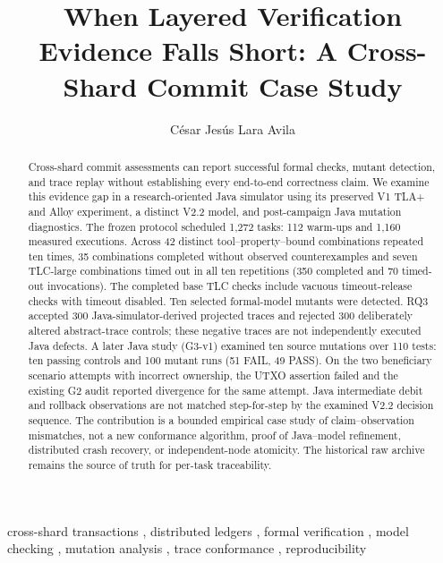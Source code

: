 \documentclass[preprint,12pt]{elsarticle}
\begin{document}
\begin{frontmatter}

\title{When Layered Verification Evidence Falls Short: A Cross-Shard Commit Case Study}

\author[uni]{César Jesús Lara Avila}
\address[uni]{Universidad Nacional de Ingeniería, Facultad de Ciencias, Ciencia de la Computación, Lima, Peru}

\begin{abstract}
Cross-shard commit assessments can report successful formal checks,
mutant detection, and trace replay without establishing every end-to-end
correctness claim. We examine this evidence gap in a research-oriented Java
simulator using its preserved V1 TLA+ and Alloy experiment, a distinct V2.2
model, and post-campaign Java mutation diagnostics. The frozen protocol
scheduled 1,272 tasks: 112 warm-ups and 1,160 measured executions. Across 42 distinct tool--property--bound combinations
repeated ten times, 35 combinations completed without observed
counterexamples and seven TLC-large combinations timed out in all ten
repetitions (350 completed and 70 timed-out invocations). The completed
base TLC checks include vacuous timeout-release checks with timeout disabled.
Ten selected formal-model
mutants were detected. RQ3 accepted 300 Java-simulator-derived projected
traces and rejected 300 deliberately altered abstract-trace controls; these
negative traces are not independently executed Java defects. A later Java
study (G3-v1) examined ten source mutations over 110 tests: ten passing
controls and 100 mutant runs (51 FAIL, 49 PASS). On the two beneficiary
scenario attempts with incorrect ownership, the UTXO assertion failed and
the existing G2 audit reported divergence for the same attempt. Java intermediate debit and
rollback observations are not matched step-for-step by the examined V2.2
decision sequence. The contribution is a bounded empirical case study of
claim--observation mismatches, not a new conformance algorithm, proof of
Java--model refinement, distributed crash recovery, or independent-node
atomicity. The historical raw archive remains the source of truth for
per-task traceability.
\end{abstract}

\begin{keyword}
cross-shard transactions \sep
distributed ledgers \sep
formal verification \sep
model checking \sep
mutation analysis \sep
trace conformance \sep
reproducibility
\end{keyword}

\end{frontmatter}
\end{document}
